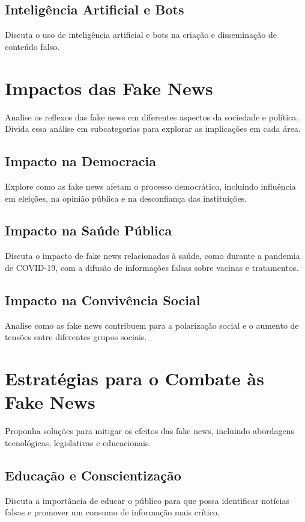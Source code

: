 \documentclass[12pt]{article}
\begin{document}
\subsection{Inteligência Artificial e Bots}
Discuta o uso de inteligência artificial e bots na criação e disseminação de conteúdo falso.

\section{Impactos das Fake News}
Analise os reflexos das fake news em diferentes aspectos da sociedade e política. Divida essa análise em subcategorias para explorar as implicações em cada área.

\subsection{Impacto na Democracia}
Explore como as fake news afetam o processo democrático, incluindo influência em eleições, na opinião pública e na desconfiança das instituições.

\subsection{Impacto na Saúde Pública}
Discuta o impacto de fake news relacionadas à saúde, como durante a pandemia de COVID-19, com a difusão de informações falsas sobre vacinas e tratamentos.

\subsection{Impacto na Convivência Social}
Analise como as fake news contribuem para a polarização social e o aumento de tensões entre diferentes grupos sociais.

\section{Estratégias para o Combate às Fake News}
Proponha soluções para mitigar os efeitos das fake news, incluindo abordagens tecnológicas, legislativas e educacionais.

\subsection{Educação e Conscientização}
Discuta a importância de educar o público para que possa identificar notícias falsas e promover um consumo de informação mais crítico.
\end{document}
